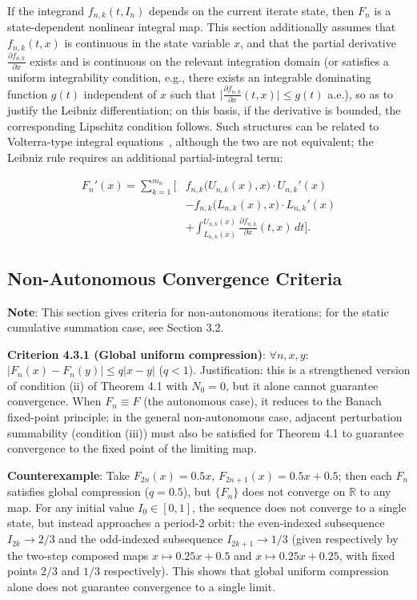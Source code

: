 \documentclass[11pt,a4paper]{amsart}
\begin{document}
If the integrand $f_{n,k}(t, I_n)$ depends on the current iterate state, then $F_n$ is a state-dependent nonlinear integral map. This section additionally assumes that $f_{n,k}(t,x)$ is continuous in the state variable $x$, and that the partial derivative $\frac{\partial f_{n,k}}{\partial x}$ exists and is continuous on the relevant integration domain (or satisfies a uniform integrability condition, e.g., there exists an integrable dominating function $g(t)$ independent of $x$ such that $\bigl|\frac{\partial f_{n,k}}{\partial x}(t,x)\bigr| \le g(t)$ a.e.), so as to justify the Leibniz differentiation; on this basis, if the derivative is bounded, the corresponding Lipschitz condition follows. Such structures can be related to Volterra-type integral equations~\cite{burton2005}, although the two are not equivalent; the Leibniz rule requires an additional partial-integral term:

\begin{equation}
\begin{aligned}
F_n'(x) = \sum_{k=1}^{m_n} \Bigg[ &f_{n,k}\bigl(U_{n,k}(x), x\bigr) \cdot U_{n,k}'(x) \\
&- f_{n,k}\bigl(L_{n,k}(x), x\bigr) \cdot L_{n,k}'(x) \\
&+ \int_{L_{n,k}(x)}^{U_{n,k}(x)} \frac{\partial f_{n,k}}{\partial x}(t, x) \, dt \Bigg].
\end{aligned}
\end{equation}

\subsection{Non-Autonomous Convergence Criteria}

\textbf{Note}: This section gives criteria for non-autonomous iterations; for the static cumulative summation case, see Section 3.2.

\textbf{Criterion 4.3.1 (Global uniform compression)}: $\forall n, x, y$: $|F_n(x) - F_n(y)| \le q|x - y|$ ($q < 1$). Justification: this is a strengthened version of condition (ii) of Theorem 4.1 with $N_0 = 0$, but it alone cannot guarantee convergence. When $F_n \equiv F$ (the autonomous case), it reduces to the Banach fixed-point principle; in the general non-autonomous case, adjacent perturbation summability (condition (iii)) must also be satisfied for Theorem 4.1 to guarantee convergence to the fixed point of the limiting map.

\textbf{Counterexample}: Take $F_{2n}(x) = 0.5x$, $F_{2n+1}(x) = 0.5x + 0.5$; then each $F_n$ satisfies global compression ($q = 0.5$), but $\{F_n\}$ does not converge on $\mathbb{R}$ to any map. For any initial value $I_0 \in [0,1]$, the sequence does not converge to a single state, but instead approaches a period-2 orbit: the even-indexed subsequence $I_{2k} \to 2/3$ and the odd-indexed subsequence $I_{2k+1} \to 1/3$ (given respectively by the two-step composed maps $x \mapsto 0.25x + 0.5$ and $x \mapsto 0.25x + 0.25$, with fixed points $2/3$ and $1/3$ respectively). This shows that global uniform compression alone does not guarantee convergence to a single limit.
\end{document}

